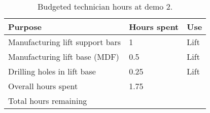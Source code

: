 \documentclass{article}
\begin{document}
\begin{table*}[h]
\vskip 3mm
\begin{center}
\begin{small}
\begin{sc}
  \begin{tabular}{lll}
    {\bf Purpose} & {\bf Hours spent} & {\bf Use} \\
    \hline
    Manufacturing lift support bars & 1 & Lift \\
    Manufacturing lift base (MDF) & 0.5 & Lift \\
    Drilling holes in lift base & 0.25 & Lift \\
    \hline
    \hline
    Overall hours spent & 1.75 & \\
    Total hours remaining & 
  \end{tabular}
\end{sc}
\end{small}
\caption{Budgeted technician hours at demo 2.}
\label{tab:budget-cost-non-monetary}
\end{center}
\vskip -3mm
\end{table*}
\end{document}
